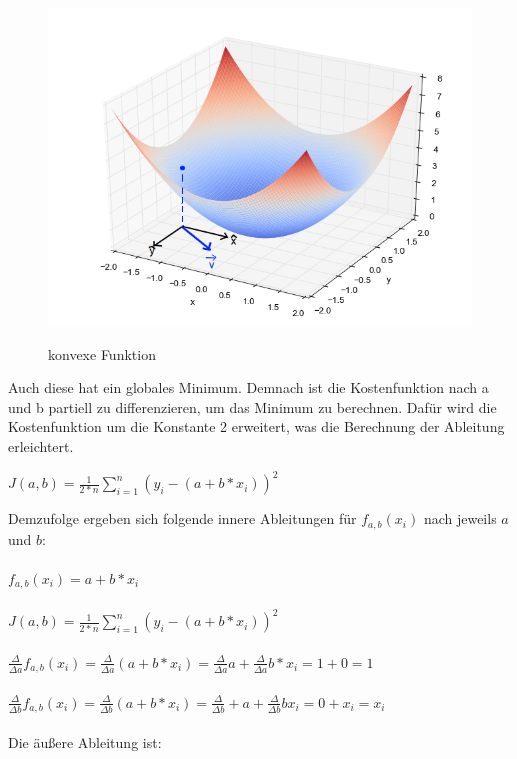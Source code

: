\begin{enumerate}
\begin{figure}[htbp]
\centering
\includegraphics[scale=.5]{Abbildungen/Lineare_Regression/konvexe_funktion}
\label{Abb:konvexe Funktion}
\caption{konvexe Funktion}
\end{figure}


Auch diese hat ein globales Minimum. Demnach ist die Kostenfunktion nach  a und b partiell zu differenzieren, um das Minimum zu berechnen. Dafür wird die Kostenfunktion um die Konstante 2 erweitert, was die Berechnung der Ableitung erleichtert.

$J (a,b)=\frac{1}{2*n}\sum_{i=1}^{n} (y_i-(a+b*x_i))^{2}$ 
  
Demzufolge ergeben sich folgende innere Ableitungen für $f_{a,b}(x_i)$ nach jeweils $a$ und $b$:
\\\\
$f_{a,b}(x_i)=a+b*x_i$
\\\\
$J (a,b)= \frac{1}{2*n}\sum_{i=1}^{n} (y_i-(a+b*x_i))^{2}$
\\\\
$\frac{\Delta}{\Delta a} f_{a,b} (x_i)= \frac{\Delta}{\Delta a} (a+b*x_i)=\frac{\Delta}{\Delta a} a+\frac{\Delta}{\Delta a} b*x_i=1+0=1$
\\\\
$\frac{\Delta}{\Delta b} f_{a,b} (x_i)= \frac{\Delta}{\Delta b} (a+b*x_i)=\frac{\Delta}{\Delta b}+a+\frac{\Delta}{\Delta b}bx_i=0+x_i =x_i$
\\\\
Die äußere Ableitung ist:


\end{enumerate}
